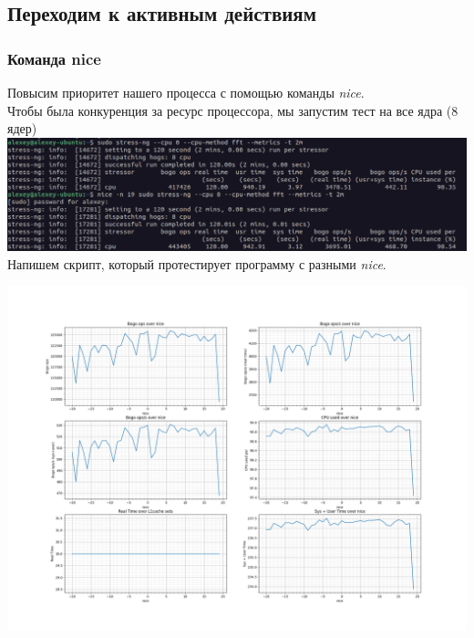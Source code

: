 \subsection{Переходим к активным действиям}
\subsubsection{Команда nice}
Повысим приоритет нашего процесса с помощью команды \textit{nice}.\\
Чтобы была конкуренция за ресурс процессора, мы запустим тест на все ядра (8 ядер)\\
\includegraphics[width=\textwidth]{image/nice.png}
Напишем скрипт, который протестирует программу с разными \textit{nice}.

\includegraphics[width=\textwidth]{cpu/image/nice-testing.png}
